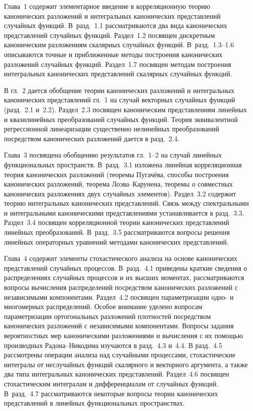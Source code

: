 \begin{multicols}{2}
{{%
      Глава~1  содержит элементарное введение в корреляционную теорию 
канонических разложений и интегральных канонических представлений случайных 
функций. В~разд.~1.1  рассматриваются два вида канонических представлений 
случайных функций. Раздел~1.2 посвящен дискретным каноническим разложениям 
скалярных случайных функций. В~разд.~1.3--1.6 описываются точные и 
приближенные методы построения канонических разложений случайных функций. 
Раздел~1.7 посвящен методам построения интегральных канонических представлений 
скалярных случайных функций. 
      
      В гл.~2 дается обобщение теории канонических разложений и  интегральных 
канонических представлений гл.~1 на случай векторных  случайных функций 
(разд.~2.1 и~2.2). Раздел~2.3 посвящен каноническим  представлениям линейных и 
квазилинейных преобразований случайных  функций. Тео\-рия эквивалентной 
регрессионной линеаризации существенно  нелинейных преобразований посредством 
канонических разложений дается  в разд.~2.4. 
      
      Глава~3 посвящена обобщению результатов гл.~1--2 на случай линейных 
функциональных пространств. В~разд.~3.1 изложена линейная корреляционная теория 
канонических разложений (теоремы Пугачёва, способы построения канонических 
разложений, теорема Лоэва--Ка\-ру\-не\-на, теоремы о совместных канонических разложениях 
двух случайных элементов). Раздел~3.2 содержит тео\-рию интегральных канонических 
представлений. Связь между спектральными и интегральными каноническими 
представлениями устанавливается в разд.~3.3. Раздел~3.4 посвящен корреляционной 
теории канонических представлений линейных преобразований. В~разд.~3.5 
рассматриваются вопросы решения линейных операторных уравнений методами 
канонических представлений. 
      
      Глава~4 содержит элементы стохастического анализа на основе канонических 
представлений случайных процессов. В~разд.~4.1 приведены краткие сведения о 
распределениях случайных процессов и их высших моментах, рассматриваются вопросы  
вычисления распределений посредством канонических разложений с независимыми 
компонентами. Раздел~4.2 посвящен параметризации одно- и многомерных 
распределений. Особое внимание уделено вопросам параметризации ортогональных 
разложений плотностей посредством канонических разложений с независимыми 
компонентами. Вопросы задания вероятностных мер каноническими разложениями и 
вычисления с их помощью производных Радона--Ни\-ко\-ди\-ма изучаются в разд.~4.3 
и~4.4. В разд.~4.5 рассмотрены операции анализа над случайными процессами, 
стохастические интегралы от неслучайных функций скалярного и векторного аргумента, а 
также два типа интегральных канонических представлений. Раздел~4.6 посвящен 
стохастическим интегралам и дифференциалам от случайных функций. В~разд.~4.7 
рассматриваются некоторые вопросы теории канонических пред\-став\-ле\-ний в линейных 
функциональных пространствах. 
      
}}
\end{multicols}
